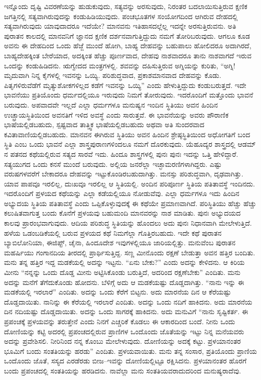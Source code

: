 ಇನ್ನೊಂದು ದೃಷ್ಟಿ ವಿವರಣೆಯನ್ನು ಹುಡುಕುವುದು, ಸತ್ಯವನ್ನು ಅರಸುವುದು, ನಿರಂತರ ಬದಲಾಯಿಸುತ್ತಿರುವ ಕ್ಷಣಿಕ ಜಗತ್ತಿನಲ್ಲಿ ಸತ್ಯವಾಗಿರುವುದನ್ನು ಕಂಡುಹಿಡಿಯುವುದು. ಪಂಚಭೂತಗಳ ಸಂಯೋಗದಿಂದ ಆಗಿರುವ ದೇಹದಲ್ಲಿ ಸತ್ಯವಾಗಿರುವುದು ಯಾವುದಾದರೂ ಇದೆಯೇ? ಮಾನವನು ಇತಿಹಾಸದಲ್ಲೆಲ್ಲ ಇದನ್ನೇ ಅರಸುತ್ತಿರುವನು. ಅತಿ ಪುರಾತನ ಕಾಲದಲ್ಲಿ ಮಾನವನಿಗೆ ಜ್ಞಾನದ ಕ್ಷಣಿಕ ದರ್ಶನವಾಗುತ್ತಿದ್ದುದು ನಮಗೆ ತೋರಿಬರುವುದು. ಆಗಲೂ ಕೂಡ ಅವನು ಈ ದೇಹದಿಂದ ಒಂದು ಹೆಜ್ಜೆ ಮುಂದೆ ಹೋಗಿ, ಬಾಹ್ಯ ದೇಹವನ್ನು ಬಹುಪಾಲು ಹೋಲಿದರೂ ಅದಾಗಿರದೆ, ಬಾಹ್ಯದೇಹಕ್ಕಿಂತ ಬೇರೆಯಾದ, ಅದಕ್ಕಿಂತ ಹೆಚ್ಚು ಪೂರ್ಣವಾದ, ದೇಹವು ನಾಶವಾದರೂ ತಾನು ನಾಶವಾಗದೆ ಇರುವ ಒಂದನ್ನು ಕಂಡುಹಿಡಿದನು. ಋಗ್ವೇದದ ಮಂತ್ರಗಳಲ್ಲಿ. ಶವವನ್ನು ದಹಿಸುತ್ತಿರುವ ಅಗ್ನಿಯನ್ನು ಕುರಿತು, “ಅಗ್ನಿ! ಮೃದುವಾಗಿ ನಿನ್ನ ಕೈಗಳಲ್ಲಿ ಇವನನ್ನು ಒಯ್ಯಿ. ಪರಿಶುದ್ಧವಾದ, ಪ್ರಕಾಶಮಾನವಾದ ದೇಹವನ್ನು ಕೊಡು. ಪಿತೃಗಳಿರುವೆಡೆಗೆ ಮೃತ್ಯುಶೋಕಗಳಿಲ್ಲದ ಕಡೆಗೆ ಇವನನ್ನು ಒಯ್ಯಿ” ಎಂದು ಹೇಳುತ್ತಿದ್ದುದು ಕಂಡುಬರುತ್ತದೆ. ಇದೇ ಭಾವನೆಯು ಪ್ರತಿಯೊಂದು ಧರ್ಮದಲ್ಲಿಯೂ ಇರುವುದು ನಿಮಗೆ ತೋರುವುದು. ಇದರೊಂದಿಗೆ ಮತ್ತೊಂದು ಭಾವನೆ ಬರುವುದು. ಅಪವಾದವೇ ಇಲ್ಲದೆ ಎಲ್ಲಾ ಧರ್ಮಗಳೂ ಮನುಷ್ಯನ ಇಂದಿನ ಸ್ಥಿತಿಯು ಅವನ ಹಿಂದಿನ ಉಚ್ಛ್ರಾಯಸ್ಥಿತಿಯಿಂದ ಅವನತಿಗೆ ಇಳಿದ ಅವಸ್ಥೆ ಎಂದು ಸಾರುತ್ತವೆ. ಈ ಭಾವನೆಯನ್ನು ಅವರು ಪೌರಾಣಿಕ ಭಾಷೆಯಲ್ಲಿಡಬಹುದು, ಸ್ಪಷ್ಟವಾದ ತಾತ್ತ್ವಿಕ ಭಾಷೆಯಲ್ಲಿಡಬಹುದು ಅಥವಾ ಅತಿ ಸುಂದರವಾದ ಕವಿತಾವಾಣಿಯಲ್ಲಿಡಬಹುದು. ಮಾನವನ ಈಗಿರುವ ಸ್ಥಿತಿಯು ಅವನ ಹಿಂದಿನ ಶ್ರೇಷ್ಠಸ್ಥಿತಿಯಿಂದ ಅಧೋಗತಿಗೆ ಬಂದ ಸ್ಥಿತಿ ಎಂಬ ಒಂದು ಭಾವನೆ ಎಲ್ಲಾ ಶಾಸ್ತ್ರಪುರಾಣಗಳಿಂದಲೂ ನಮಗೆ ದೊರಕುವುದು. ಯೆಹೂದ್ಯರ ಶಾಸ್ತ್ರದಲ್ಲಿ ಆಡಮ್​ನ ಪತನದ ಕಥೆಯಲ್ಲಿರುವ ಸತ್ಯದ ಸಾರವೆ ಇದು. ಹಿಂದೂ ಶಾಸ್ತ್ರಗಳಲ್ಲಿ ಪುನಃ ಪುನಃ ಇದನ್ನು ಒತ್ತಿ ಹೇಳಿದ್ದಾರೆ. ಸತ್ಯಯುಗದ ಒಂದು ಕನಸೆ ಮುಂದೆ ಬರುವುದು. ಅಲ್ಲಿಯ ಜನರೆಲ್ಲಾ ಇಚ್ಛಾಮರಣಿಗಳಾಗಿದ್ದರು. ಎಷ್ಟು ವರುಷಗಳವರೆಗೆ ಬೇಕಾದರೂ ದೇಹವನ್ನು ಇಟ್ಟುಕೊಂಡಿರಬಹುದಾಗಿತ್ತು. ಮನಸ್ಸು ಪರಿಶುದ್ಧವಾಗಿ, ದೃಢವಾಗಿತ್ತು. ಯಾವ ಪಾಪವೂ ಇರಲಿಲ್ಲ, ದುಃಖವೂ ಇರಲಿಲ್ಲ ಆ ಸ್ಥಿತಿಯಲ್ಲಿ. ಅಂದಿನ ಪರಿಪೂರ್ಣ ಸ್ಥಿತಿಯ ಪತಿತಾವಸ್ಥೆ ಇಂದಿನದು. ಇದರೊಂದಿಗೆ ಪ್ರಳಯದ ಕಥೆಯನ್ನು ಎಲ್ಲಾ ಕಡೆಯಲ್ಲಿಯೂ ನೋಡುವೆವು. ಎಲ್ಲಾ ಧರ್ಮಗಳೂ ಇದು ಹಿಂದಿನ ಅಭ್ಯುದಯ ಸ್ಥಿತಿಯ ಪತಿತಾವಸ್ಥೆ ಎಂದು ಒಪ್ಪಿಕೊಳ್ಳುವುದಕ್ಕೆ ಈ ಕಥೆಯೇ ಪ್ರಮಾಣವಾಗಿದೆ. ಪರಿಸ್ಥಿತಿಯು ಹೆಚ್ಚು ಹೆಚ್ಚು ಕಲುಷಿತವಾಗುತ್ತ ಬಂದು ಕೊನೆಗೆ ಪ್ರಳಯವು ಬಹುಮಂದಿ ಮಾನವರನ್ನು ನಾಶ ಮಾಡಿತು. ಪುನಃ ಅಭ್ಯುದಯದ ಕಾಲವು ಪ್ರಾರಂಭವಾಗುವುದು. ಆದಿಯ ಪರಿಶುದ್ಧ ಸ್ಥಿತಿಯನ್ನು ಹೊಂದಲು ಅದು ಪುನಃ ನಿಧಾನವಾಗಿ ಮೇಲೇಳುತ್ತಿದೆ. ಹಳೆಯ ಒಡಂಬಡಿಕೆಯಲ್ಲಿ ಬರುವ ಪ್ರಳಯದ ಕಥೆ ನಿಮಗೆಲ್ಲಾ ಗೊತ್ತಿರಬಹುದು. ಇದೇ ಕಥೆ ಪುರಾತನ ಬ್ಯಾಬಿಲೋನಿಯಾ, ಈಜಿಪ್ಟ್​, ಚೈನಾ, ಹಿಂದೂದೇಶ ಇವುಗಳಲ್ಲಿಯೂ ಜಾರಿಯಲ್ಲಿತ್ತು. ಮನುವೆಂಬ ಪುರಾತನ ಮಹರ್ಷಿಯು ಗಂಗಾನದಿಯ ತೀರದಲ್ಲಿ ಪ್ರಾರ್ಥಿಸುತ್ತಿದ್ದ. ಸಣ್ಣ ಮೀನೊಂದು ರಕ್ಷಣೆ ಬೇಡುತ್ತಾ ಅವನ ಹತ್ತಿರ ಬಂದಿತು. ಮನು ತನ್ನ ಹತ್ತಿರ ಇದ್ದ ಮಡಕೆಯಲ್ಲಿ ಅದನ್ನು ಇಟ್ಟನು. “ಏನು ಬೇಕು?” ಎಂದು ಅದನ್ನು ಕೇಳಿದನು. ಆ ಕಿರಿಯ ಮೀನು “ನನ್ನನ್ನು ಒಂದು ದೊಡ್ಡ ಮೀನು ಅಟ್ಟಿಸಿಕೊಂಡು ಬರುತ್ತಿದೆ, ಅದರಿಂದ ರಕ್ಷಣೆಬೇಕು” ಎಂದಿತು. ಮನು ಅದನ್ನು ಮನೆಗೆ ತೆಗೆದುಕೊಂಡು ಹೋದನು. ಬೆಳಿಗ್ಗೆ ಅದು ಆ ಮಡಕೆಯಷ್ಟು ದೊಡ್ಡದಾಗಿತ್ತು. “ನಾನು ಇನ್ನು ಈ ಮಡಕೆಯಲ್ಲಿ ಇರಲಾರೆ” ಎಂದಿತು. ಅದನ್ನು ಒಂದು ಕೆರೆಗೆ ಬಿಟ್ಟನು. ಅದು ಮಾರನೆಯ ದಿನ ಆ ಕೆರೆಯಷ್ಟು ದೊಡ್ಡದಾಯಿತು. ನಾನಿನ್ನು ಈ ಕೆರೆಯಲ್ಲಿ ಇರಲಾರೆ ಎಂದಿತು. ಅದನ್ನು ಒಂದು ನದಿಗೆ ಹಾಕಿದನು. ಅದು ಮಾರನೆಯ ದಿನ ನದಿಯಷ್ಟು ದೊಡ್ಡದಾಯಿತು. ಅದನ್ನು ಒಂದು ಸಾಗರಕ್ಕೆ ಹಾಕಿದನು. ಅದು ಮನುವಿಗೆ “ನಾನು ಸೃಷ್ಟಿಕರ್ತ. ಈ ಪ್ರಪಂಚಕ್ಕೆ ಪ್ರಳಯವನ್ನು ತರುತ್ತೇನೆ ಎಂದು ನಿನಗೆ ಎಚ್ಚರಿಕೆ ಕೊಡಲು ಈ ಆಕಾರದಿಂದ ಬಂದೆ. ನೀನು ಒಂದು ದೋಣಿಯನ್ನು ಕಟ್ಟಿ ಅದರಲ್ಲಿ ಪ್ರಪಂಚದಲ್ಲಿರುವ ಪ್ರಾಣಿಗಳ ಒಂದೊಂದು ಜೊತೆಯನ್ನು ಇಟ್ಟು ನಿನ್ನ ಮನೆಯವರು ಅದನ್ನು ಪ್ರವೇಶಿಸಲಿ. ನೀರಿನಿಂದ ನನ್ನ ಕೊಂಬು ಮೇಲೇಳುವುದು. ದೋಣಿಯನ್ನು ಅದಕ್ಕೆ ಕಟ್ಟು. ಪ್ರಳಯಾನಂತರ ಭೂಮಿಗೆ ಬಂದು ಸಂತತಿಯನ್ನು ಹರಡು” ಎಂದಿತು. ಪ್ರಳಯವಾಯಿತು. ಮನು ತನ್ನ ಸಂಸಾರ, ಪ್ರತಿಯೊಂದು ಪ್ರಾಣಿಯ ಒಂದೊಂದು ಜೊತೆ, ಸಸ್ಯದ ಎರಡೆರಡು ಬೀಜ–ಇವನ್ನು ದೋಣಿಯಲ್ಲಿಟ್ಟೂ ರಕ್ಷಿಸಿದನು. ಪ್ರಳಯಾನಂತರ ಹೊರಗೆ ಬಂದು ಪ್ರಪಂಚದಲ್ಲಿ ಸಂತತಿಯನ್ನು ಹರಡಿದನು. ನಾವೆಲ್ಲಾ ಮನು ಸಂತತಿಯವರಾದುದರಿಂದ ಮನುಷ್ಯರಾದೆವು.

